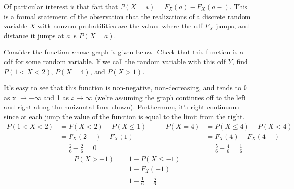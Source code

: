 Of particular interest is that fact that $P(X=a) = F_X(a) - F_X(a-)$. This is a formal statement of the observation that the realizations of a discrete random variable $X$ with nonzero probabilities are the values where the cdf $F_X$ jumps, and distance it jumps at $a$ is $P(X = a)$.

\begin{example}
Consider the function whose graph is given below. Check that this function is a cdf for some random variable. If we call the random variable with this cdf $Y$, find $P(1 < X < 2)$, $P(X = 4)$, and $P(X > 1)$.

\begin{center}
\end{center}

It's easy to see that this function is non-negative, non-decreasing, and tends to $0$ as x $\to -\infty$ and 1 as $x \to \infty$ (we're assuming the graph continues off to the left and right along the horizontal lines shown). Furthermore, it's right-continuous since at each jump the value of the function is equal to the limit from the right.
$$\begin{aligned}P(1 < X < 2) &= P(X < 2) - P(X \leq 1) & \qquad P(X = 4) &= P(X \leq 4) - P(X < 4) \\
&=F_X(2-) - F_X(1) &  &=F_X(4) - F_X(4-) \\
&=\frac{2}{6} - \frac{2}{6} = 0 &  &=\frac{5}{6} - \frac{4}{6} = \frac{1}{6}\end{aligned}$$
\vspace{1em}
$$\begin{aligned}P(X > -1) &= 1 - P(X \leq -1) \\  &= 1 - F_X(-1) \\ & = 1 - \frac{1}{6} = \frac{5}{6}\end{aligned}$$
\end{example}

